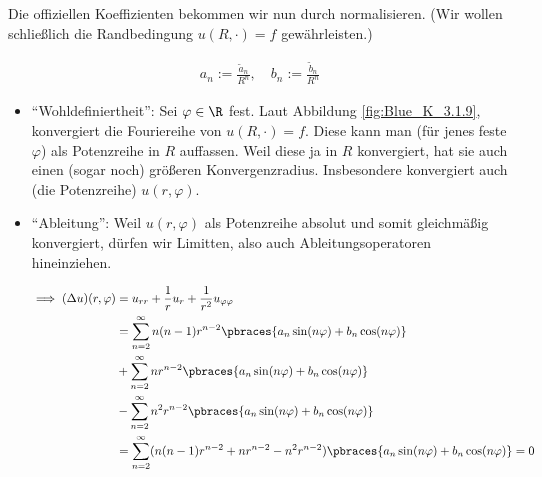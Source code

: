 \begin{solution}
\begin{enumerate}[label = (\roman*)]

    Die offiziellen Koeffizienten bekommen wir nun durch normalisieren.
    (Wir wollen schließlich die Randbedingung $u(R, \cdot) = f$ gewährleisten.)

    \begin{align*}
        a_n := \frac{\tilde{a}_n}{R^n},
        \quad
        b_n := \frac{\tilde{b}_n}{R^n}
    \end{align*}

    \begin{itemize}

        \item \enquote{Wohldefiniertheit}:
        Sei $\varphi \in \R$ fest.
        Laut Abbildung \ref{fig:Blue_K_3.1.9}, konvergiert die Fouriereihe von $u(R, \cdot) = f$.
        Diese kann man (für jenes feste $\varphi$) als Potenzreihe in $R$ auffassen.
        Weil diese ja in $R$ konvergiert, hat sie auch einen (sogar noch) größeren Konvergenzradius.
        Insbesondere konvergiert auch (die Potenzreihe) $u(r, \varphi)$.

        \item \enquote{Ableitung}:
        Weil $u(r, \varphi)$ als Potenzreihe absolut und somit gleichmäßig konvergiert, dürfen wir Limitten, also auch Ableitungsoperatoren hineinziehen.

        \begin{align*}
            \implies
            (\Delta u)(r, \varphi)
            & =
            u_{rr} + \frac{1}{r} u_r + \frac{1}{r^2} u_{\varphi \varphi} \\
            & =
            \sum_{n=2}^\infty
            n (n-1) r^{n-2}
            \pbraces
            {
                a_n \sin(n \varphi)
                +
                b_n \cos(n \varphi)
            } \\
            & +
            \sum_{n=2}^\infty
            n r^{n-2}
            \pbraces
            {
                a_n \sin(n \varphi)
                +
                b_n \cos(n \varphi)
            } \\
            & -
            \sum_{n=2}^\infty
            n^2 r^{n-2}
            \pbraces
            {
                a_n \sin(n \varphi)
                +
                b_n \cos(n \varphi)
            } \\
            & =
            \sum_{n=2}^\infty
            (
                n (n-1) r^{n-2}
                +
                n r^{n-2}
                -
                n^2 r^{n-2}
            )
            \pbraces
            {
                a_n \sin(n \varphi)
                +
                b_n \cos(n \varphi)
            }
            = 0
        \end{align*}


\end{itemize}
\end{enumerate}
\end{solution}

